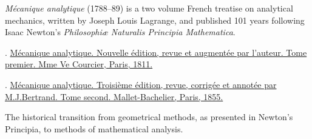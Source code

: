 

\label{section:virtualworkprinciple.genericmechanics}

\emph{Mécanique analytique} (1788--89) is a two volume French treatise on analytical mechanics, written by Joseph Louis Lagrange, and published 101 years following Isaac Newton’s \emph{Philosophiæ Naturalis Principia Mathematica}.

.
\href{https://play.google.com/books/reader?id=Q8MKAAAAYAAJ&pg=GBS.PP7}{Mécanique analytique. Nouvelle édition, revue et augmentée par l’auteur. Tome premier. Mme Ve Courcier, Paris, 1811.} 

.
\href{https://play.google.com/books/reader?id=TmMSAAAAIAAJ&pg=GBS.PP9}{Mécanique analytique. Troisième édition, revue, corrigée et annotée par M.\:J.\:Bertrand. Tome second. Mallet-Bachelier, Paris, 1855.} 

The historical transition from geometrical methods, as presented in Newton’s Principia, to methods of mathematical analysis.

